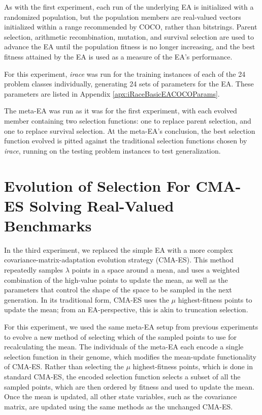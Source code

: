 \documentclass[times,12pt,titlepage]{mstogs}
\begin{document}
\begin{ThesisBody}
As with the first experiment, each run of the underlying EA is initialized with a randomized population, but the population members are real-valued vectors initialized within a range recommended by COCO, rather than bitstrings. Parent selection, arithmetic recombination, mutation, and survival selection are used to advance the EA until the population fitness is no longer increasing, and the best fitness attained by the EA is used as a measure of the EA's performance.

For this experiment, \textit{irace} was run for the training instances of each of the 24 problem classes individually, generating 24 sets of parameters for the EA. These parameters are listed in Appendix \ref{apx:iRaceBasicEACOCOParams}. 

The meta-EA was run as it was for the first experiment, with each evolved member containing two selection functions: one to replace parent selection, and one to replace survival selection. At the meta-EA's conclusion, the best selection function evolved is pitted against the traditional selection functions chosen by \textit{irace}, running on the testing problem instances to test generalization.

\section{Evolution of Selection For CMA-ES Solving Real-Valued\protect\\ Benchmarks}
\label{Evolution of Selection For CMA-ES Solving Real-Valued Benchmarks}

In the third experiment, we replaced the simple EA with a more complex covariance-matrix-adaptation evolution strategy (CMA-ES). This method repeatedly samples $\lambda$ points in a space around a mean, and uses a weighted combination of the high-value points to update the mean, as well as the parameters that control the shape of the space to be sampled in the next generation. In its traditional form, CMA-ES uses the $\mu$ highest-fitness points to update the mean; from an EA-perspective, this is akin to truncation selection. 

For this experiment, we used the same meta-EA setup from previous experiments to evolve a new method of selecting which of the sampled points to use for recalculating the mean. The individuals of the meta-EA each encode a single selection function in their genome, which modifies the mean-update functionality of CMA-ES. Rather than selecting the $\mu$ highest-fitness points, which is done in standard CMA-ES, the encoded selection function selects a subset of all the sampled points, which are then ordered by fitness and used to update the mean. Once the mean is updated, all other state variables, such as the covariance matrix, are updated using the same methods as the unchanged CMA-ES.


\end{ThesisBody}
\end{document}

